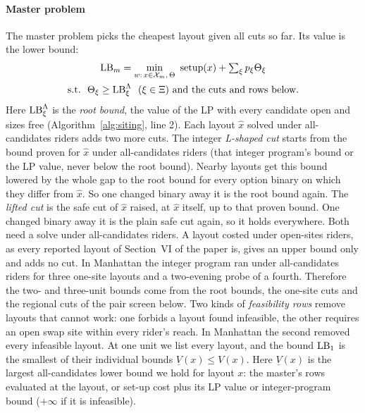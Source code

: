 \paragraph*{Master problem}
The master problem picks the cheapest layout given all cuts so far. Its value is the lower bound:
\begin{equation}\label{eq:master}
  \begin{gathered}
  \LB_m=\min_{w:\,x\in\mathcal X_m,\,\Theta}\ \mathrm{setup}(x)+\textstyle\sum_\xi p_\xi\Theta_\xi\\
  \text{s.t.}\ \ \Theta_\xi\ge\LB^{\Lambda}_\xi\ \ (\xi\in\Xi)\ \text{and the cuts and rows below}.
  \end{gathered}
\end{equation}
Here $\mathrm{LB}^{\Lambda}_\xi$ is the \emph{root bound}, the value of the LP with every candidate open and sizes free (Algorithm~\ref{alg:siting}, line 2). Each layout $\hat x$ solved under all-candidates riders adds two more cuts. The integer \emph{L-shaped cut} \cite{laporte1993integer} starts from the bound proven for $\hat x$ under all-candidates riders (that integer program's bound or the LP value, never below the root bound). Nearby layouts get this bound lowered by the whole gap to the root bound for every option binary on which they differ from $\hat x$. So one changed binary away it is the root bound again. The \emph{lifted cut} is the safe cut of $\hat x$ raised, at $\hat x$ itself, up to that proven bound. One changed binary away it is the plain safe cut again, so it holds everywhere. Both need a solve under all-candidates riders. A layout costed under open-sites riders, as every reported layout of Section~VI of the paper is, gives an upper bound only and adds no cut. In Manhattan the integer program ran under all-candidates riders for three one-site layouts and a two-evening probe of a fourth. Therefore the two- and three-unit bounds come from the root bounds, the one-site cuts and the regional cuts of the pair screen below. Two kinds of \emph{feasibility rows} remove layouts that cannot work: one forbids a layout found infeasible, the other requires an open swap site within every rider's reach. In Manhattan the second removed every infeasible layout. At one unit we list every layout, and the bound $\mathrm{LB}_1$ is the smallest of their individual bounds $\underline V(x)\le V(x)$. Here $\underline V(x)$ is the largest all-candidates lower bound we hold for layout $x$: the master's rows evaluated at the layout, or set-up cost plus its LP value or integer-program bound ($+\infty$ if it is infeasible).

